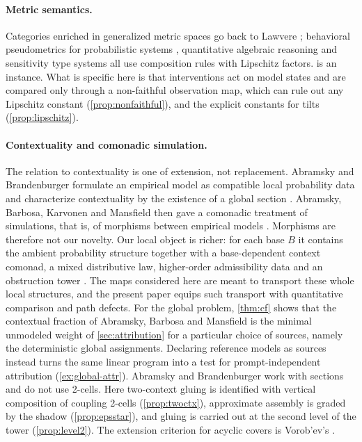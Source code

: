 \documentclass[11pt]{article}
\theoremstyle{definition}
\theoremstyle{remark}
\begin{document}
\paragraph{Metric semantics.} Categories enriched in generalized metric spaces go back to Lawvere
\cite{Lawvere1973}; behavioral pseudometrics for probabilistic systems \cite{Desharnais2004},
quantitative algebraic reasoning \cite{MPP2016} and sensitivity type systems \cite{ReedPierce2010} all
use composition rules with Lipschitz factors.  is an instance. What is specific
here is that interventions act on model states and are compared only through a non-faithful
observation map, which can rule out any Lipschitz constant (\cref{prop:nonfaithful}), and the explicit
constants for tilts (\cref{prop:lipschitz}).

\paragraph{Contextuality and comonadic simulation.} The relation to contextuality is one of extension,
not replacement. Abramsky and Brandenburger formulate an empirical model as compatible local probability
data and characterize contextuality by the existence of a global section
\cite{AbramskyBrandenburger2011}. Abramsky, Barbosa, Karvonen and Mansfield then gave a comonadic
treatment of simulations, that is, of morphisms between empirical models \cite{Abramsky2019}. Morphisms
are therefore not our novelty. Our local object is richer: for each base $B$ it contains the ambient
probability structure together with a base-dependent context comonad, a mixed distributive law,
higher-order admissibility data and an obstruction tower \cite{Awasthi-Tower}. The maps considered here
are meant to transport these whole local structures, and the present paper equips such transport with
quantitative comparison and path defects. For the global problem, \cref{thm:cf} shows that the
contextual fraction of Abramsky, Barbosa and Mansfield \cite{ABM2017} is the minimal unmodeled weight of
\cref{sec:attribution} for a particular choice of sources, namely the deterministic global assignments.
Declaring reference models as sources instead turns the same linear program into a test for
prompt-independent attribution (\cref{ex:global-attr}). Abramsky and Brandenburger work with sections
and do not use 2-cells. Here two-context gluing is identified with vertical composition of coupling
2-cells (\cref{prop:twoctx}), approximate assembly is graded by the shadow (\cref{prop:epsstar}), and
gluing is carried out at the second level of the tower (\cref{prop:level2}). The extension criterion for
acyclic covers is Vorob'ev's \cite{Vorobev1962}.
\end{document}
